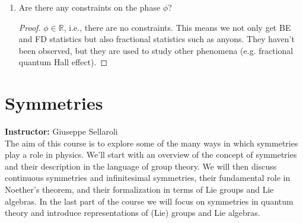 \documentclass{book}
\theoremstyle{definition}
\newcommand{\R}{\mathbb{R}}
\begin{document}
\begin{enumerate}
\begin{proof}
	\end{proof}



	\item Are there any constraints on the phase $\phi$? 
	
	\begin{proof}
		$\phi \in \R$, i.e., there are no constraints. This means we not only get BE and FD statistics but also fractional statistics such as anyons. They haven't been observed, but they are used to study other phenomena (e.g. fractional quantum Hall effect). 
	\end{proof}
\end{enumerate} 





\newpage









































\chapter{Symmetries}

\textbf{Instructor:} Giuseppe Sellaroli\\

The aim of this course is to  explore some of the many ways in which symmetries play a role in physics. We'll start with an overview of the concept of symmetries and their description in the language of  group theory. We will then discuss continuous symmetries and infinitesimal symmetries, their fundamental role in Noether's theorem, and their formalization in terms of Lie groups and Lie algebras. In the last part of the course we will focus on symmetries in quantum theory and introduce representations of (Lie) groups and Lie algebras.
\end{document}
